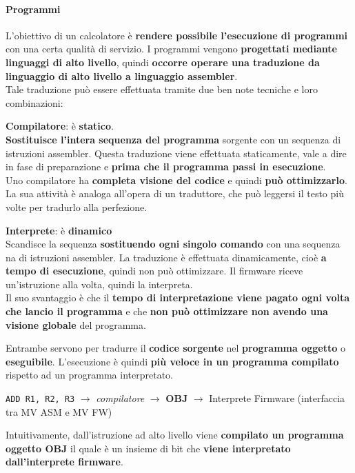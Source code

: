 \documentclass[10pt]{report}
\begin{document}
\paragraph{Programmi} L'obiettivo di un calcolatore è \textbf{rendere possibile l'esecuzione di programmi} con una certa qualità di servizio. I programmi vengono \textbf{progettati mediante linguaggi di alto livello}, quindi \textbf{occorre operare una traduzione da linguaggio di alto livello a linguaggio assembler}.\\
Tale traduzione può essere effettuata tramite due ben note tecniche e loro combinazioni:
\begin{multicols}{2}
\textbf{Compilatore}: è \textbf{statico}.\\\textbf{Sostituisce l'intera sequenza del programma} sorgente con un sequenza di istruzioni assembler. Questa traduzione viene effettuata staticamente, vale a dire in fase di preparazione e \textbf{prima che il programma passi in esecuzione}.\\
Uno compilatore ha \textbf{completa visione del codice} e quindi \textbf{può ottimizzarlo}. La sua attività è analoga all'opera di un traduttore, che può leggersi il testo più volte per tradurlo alla perfezione.
\columnbreak

\textbf{Interprete}: è \textbf{dinamico}\\ Scandisce la sequenza \textbf{sostituendo ogni singolo comando} con una sequenza na di istruzioni assembler. La traduzione è effettuata dinamicamente, cioè \textbf{a tempo di esecuzione}, quindi non può ottimizzare. Il firmware riceve un'istruzione alla volta, quindi la interpreta.\\
Il suo svantaggio è che il \textbf{tempo di interpretazione viene pagato ogni volta che lancio il programma} e che \textbf{non può ottimizzare non avendo una visione globale} del programma.
\end{multicols}
Entrambe servono per tradurre il \textbf{codice sorgente} nel \textbf{programma oggetto} o \textbf{eseguibile}. L'esecuzione è quindi \textbf{più veloce in un programma compilato} rispetto ad un programma interpretato.
\begin{center}
\texttt{ADD R1, R2, R3} $\longrightarrow$ \textit{compilatore} $\longrightarrow$ \textbf{OBJ} $\longrightarrow$ Interprete Firmware (interfaccia tra MV ASM e MV FW)
\end{center}
Intuitivamente, dall'istruzione ad alto livello viene \textbf{compilato un programma oggetto OBJ} il quale è un insieme di bit che \textbf{viene interpretato dall'interprete firmware}.
\end{document}

